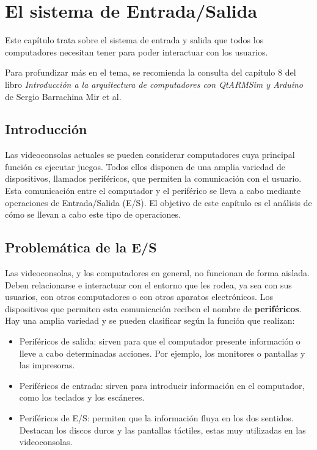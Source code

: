 \chapter{El sistema de Entrada/Salida}

Este capítulo trata sobre el sistema de entrada y salida que todos los computadores necesitan tener para poder interactuar con los usuarios.

Para profundizar más en el tema, se recomienda la consulta del capítulo 8 del libro \textit{Introducción a la arquitectura de computadores con QtARMSim y Arduino} de Sergio Barrachina Mir et al.

\section{Introducción}
Las videoconsolas actuales se pueden considerar computadores cuya principal función es ejecutar juegos. Todos ellos   disponen de una amplia variedad de dispositivos, llamados periféricos,  que  permiten la comunicación con el usuario. Esta comunicación entre el computador y el periférico se lleva a cabo mediante operaciones de Entrada/Salida (E/S). El objetivo de este capítulo es el análisis de cómo se llevan a cabo este tipo de operaciones.

\section{Problemática de la E/S}
Las videoconsolas, y los computadores en general,  no funcionan de forma aislada. Deben relacionarse e interactuar con el entorno que les rodea, ya sea con sus usuarios, con otros computadores o con otros aparatos electrónicos. Los dispositivos que permiten esta comunicación reciben el nombre de {\bf periféricos}. Hay una amplia variedad  y se pueden clasificar según la  función que realizan: 

\begin{itemize}
	\item Periféricos de salida: sirven para que el computador presente información o lleve a cabo determinadas acciones. Por ejemplo, los monitores o pantallas y las impresoras. 
	\item Periféricos de entrada: sirven para introducir información en el computador, como los teclados y los escáneres.
	\item Periféricos de E/S: permiten que la información fluya en los dos sentidos. Destacan los discos duros y las pantallas táctiles, estas muy utilizadas en las videoconsolas.
\end{itemize}

